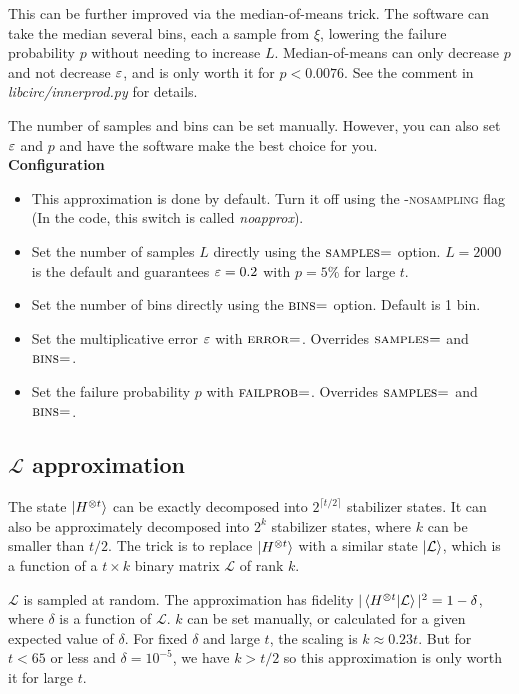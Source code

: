 \documentclass[11pt]{article}
\begin{document}
This can be further improved via the median-of-means trick. The software can take the median several bins, each a sample from $\xi$, lowering the failure probability $p$ without needing to increase $L$. Median-of-means can only decrease $p$ and not decrease $\varepsilon$, and is only worth it for $p < 0.0076$. See the comment in \textit{libcirc/innerprod.py} for details.

The number of samples and bins can be set manually. However, you can also set $\varepsilon$ and $p$ and have the software make the best choice for you.\\

\noindent \textbf{Configuration}
\begin{itemize}
    \item This approximation is done by default. Turn it off using the \textsc{-nosampling} flag (In the code, this switch is called \textit{noapprox}).
    \item Set the number of samples $L$ directly using the $\textsc{samples=}$ option. $L=2000$ is the default and guarantees $\varepsilon = 0.2$ with $p = 5\%$ for large $t$.
    \item Set the number of bins directly using the $\textsc{bins=}$ option. Default is 1 bin.
    \item Set the multiplicative error $\varepsilon$ with $\textsc{error=}$. Overrides $\textsc{samples=}$ and $\textsc{bins=}$.
    \item Set the failure probability $p$ with $\textsc{failprob=}$. Overrides $\textsc{samples=}$ and $\textsc{bins=}$.
\end{itemize}

\subsection{$\mathcal{L}$ approximation} \label{sec:msa}

The state $\ket{H^{\otimes t}}$ can be exactly decomposed into $2^{\lceil t/2\rceil}$ stabilizer states. It can also be approximately decomposed into  $2^{k}$ stabilizer states, where $k$ can be smaller than $t/2$. The trick is to replace $\ket{H^{\otimes t}}$ with a similar state $\ket{\mathcal{L}}$, which is a function of a $t \times k$ binary matrix $\mathcal{L}$ of rank $k$. 

$\mathcal{L}$ is sampled at random. The approximation has fidelity $|\braket{H^{\otimes t}|\mathcal{L}}|^2 = 1-\delta$, where $\delta$ is a function of $\mathcal{L}$. $k$ can be set manually, or calculated for a given expected value of $\delta$. For fixed $\delta$ and large $t$, the scaling is $k \approx 0.23 t$. But for $t < 65$ or less and $\delta = 10^{-5}$, we have $k > t/2$ so this approximation is only worth it for large $t$.
\end{document}
